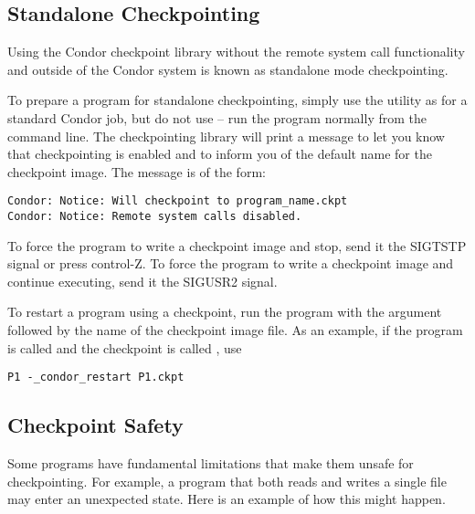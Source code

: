 \subsection{\label{sec:standalone-ckpt}Standalone Checkpointing}

Using the Condor checkpoint library without the remote system call
functionality and outside of the Condor system is known as standalone
mode checkpointing.

To prepare a program for standalone checkpointing, simply use the
 utility as for a standard Condor job, but do not
use  -- run the program normally from the command
line.  The checkpointing library will print a message to let you know
that checkpointing is enabled and to inform you of the default
name for the checkpoint image. The message is of the form:

\footnotesize
\begin{verbatim}
Condor: Notice: Will checkpoint to program_name.ckpt
Condor: Notice: Remote system calls disabled.
\end{verbatim}
\normalsize

To force the program to write a checkpoint image and stop, send it
the SIGTSTP signal or press control-Z.  To force the program to 
write a checkpoint image and continue executing, send it the
SIGUSR2 signal.

To restart a program using a checkpoint, run the program
with the argument
 followed by the name of the checkpoint
image file.
As an example, if the program is called  and
the checkpoint is called , use
\begin{verbatim}
P1 -_condor_restart P1.ckpt
\end{verbatim}

\subsection{\label{sec:ckpt-safety}Checkpoint Safety}

Some programs have fundamental limitations that make them
unsafe for checkpointing.  For example, a program that both reads
and writes a single file may enter an unexpected state. Here
is an example of how this might happen.

